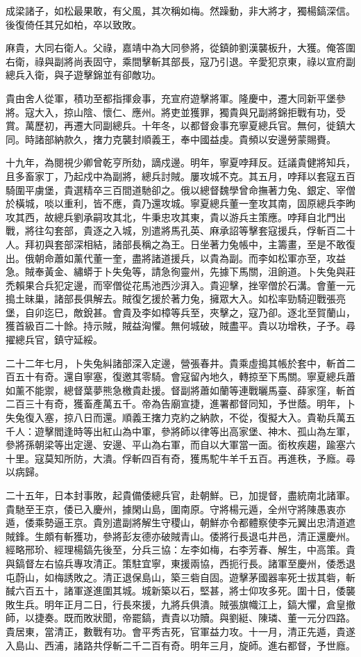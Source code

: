 \begin{pinyinscope}
成梁諸子，如松最果敢，有父風，其次稱如梅。然躁動，非大將才，獨楊鎬深信。後復倚任其兄如柏，卒以致敗。

麻貴，大同右衛人。父祿，嘉靖中為大同參將，從鎮帥劉漢襲板升，大獲。俺答圍右衛，祿與副將尚表固守，乘間擊斬其部長，寇乃引退。辛愛犯京東，祿以宣府副總兵入衛，與子遊擊錦並有卻敵功。

貴由舍人從軍，積功至都指揮僉事，充宣府遊擊將軍。隆慶中，遷大同新平堡參將。寇大入，掠山陰、懷仁、應州。將吏並獲罪，獨貴與兄副將錦拒戰有功，受賞。萬歷初，再遷大同副總兵。十年冬，以都督僉事充寧夏總兵官。無何，徙鎮大同。時諸部納款久，撦力克襲封順義王，奉中國益虔。貴頻以安邊勞蒙賜賚。

十九年，為閱視少卿曾乾亨所劾，謫戍邊。明年，寧夏哱拜反。廷議貴健將知兵，且多畜家丁，乃起戍中為副將，總兵討賊。屢攻城不克。其五月，哱拜以套寇五百騎圍平虜堡，貴選精卒三百間道馳卻之。俄以總督魏學曾命撫著力兔、銀定、宰僧於橫城，啖以重利，皆不應，貴乃還攻城。寧夏總兵董一奎攻其南，固原總兵李昫攻其西，故總兵劉承嗣攻其北，牛秉忠攻其東，貴以游兵主策應。哱拜自北門出戰，將往勾套部，貴逐之入城，別遣將馬孔英、麻承詔等擊套寇援兵，俘斬百二十人。拜初與套部深相結，諸部長稱之為王。日坐著力兔帳中，主籌畫，至是不敢復出。俄朝命蕭如薰代董一奎，盡將諸道援兵，以貴為副。而李如松軍亦至，攻益急。賊奉黃金、繡蟒于卜失兔等，請急徇靈州，先據下馬關，沮餉道。卜失兔與莊禿賴果合兵犯定邊，而宰僧從花馬池西沙湃入。貴迎擊，挫宰僧於石溝。會董一元搗土昧巢，諸部長俱解去。賊復乞援於著力兔，擁眾大入。如松率勁騎迎戰張亮堡，自卯迄巳，敵銳甚。會貴及李如樟等兵至，夾擊之，寇乃卻。逐北至賀蘭山，獲首級百二十餘。持示賊，賊益洶懼。無何城破，賊盡平。貴以功增秩，子予。尋擢總兵官，鎮守延綏。

二十二年七月，卜失兔糾諸部深入定邊，營張春井。貴乘虛搗其帳於套中，斬首二百五十有奇。還自寧塞，復邀其零騎。會寇留內地久，轉掠至下馬關。寧夏總兵蕭如薰不能禦，總督葉夢熊急檄貴赴援。督副將蕭如蘭等連戰曬馬臺、薛家窪，斬首二百三十有奇，獲畜產萬五千。帝為告廟宣捷，進署都督同知，予世蔭。明年，卜失兔復入塞，掠八日而還。順義王撦力克約之納款，不從，復擬大入。貴勒兵萬五千人：遊擊閻逢時等出紅山為中軍，參將師以律等出高家堡、神木、孤山為左軍，參將孫朝梁等出定邊、安邊、平山為右軍，而自以大軍當一面。銜枚疾趨，踰塞六十里。寇莫知所防，大潰。俘斬四百有奇，獲馬駝牛羊千五百。再進秩，予廕。尋以病歸。

二十五年，日本封事敗，起貴備倭總兵官，赴朝鮮。已，加提督，盡統南北諸軍。貴馳至王京，倭已入慶州，據閑山島，圍南原。守將楊元遁，全州守將陳愚衷亦遁，倭乘勢逼王京。貴別遣副將解生守稷山，朝鮮亦令都體察使李元翼出忠清道遮賊鋒。生頗有斬獲功，參將彭友德亦破賊青山。倭將行長退屯井邑，清正還慶州。經略邢玠、經理楊鎬先後至，分兵三協：左李如梅，右李芳春、解生，中高策。貴與鎬督左右協兵專攻清正。策駐宜寧，東援兩協，西扼行長。諸軍至慶州，倭悉退屯蔚山，如梅誘敗之。清正退保島山，築三砦自固。遊擊茅國器率死士拔其砦，斬馘六百五十，諸軍遂進圍其城。城新築以石，堅甚，將士仰攻多死。圍十日，倭襲敗生兵。明年正月二日，行長來援，九將兵俱潰。賊張旗幟江上，鎬大懼，倉皇撤師，以捷奏。既而敗狀聞，帝罷鎬，責貴以功贖。與劉綎、陳璘、董一元分四路。貴居東，當清正，數戰有功。會平秀吉死，官軍益力攻。十一月，清正先遁，貴遂入島山、西浦，諸路共俘斬二千二百有奇。明年三月，旋師。進右都督，予世廕。


\end{pinyinscope}
